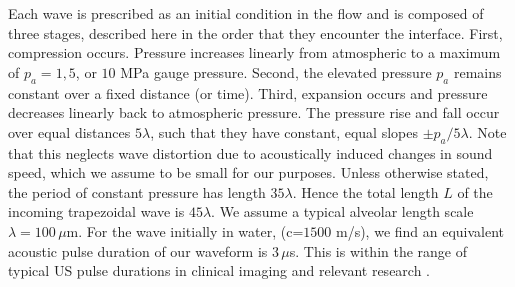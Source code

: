 Each wave is prescribed as an initial condition in the flow and is
composed of three stages, described here in the order that they
encounter the interface. First, compression occurs. Pressure increases
linearly from atmospheric to a maximum of $p_a=1, 5$, or $10$ MPa
gauge pressure. Second, the elevated pressure $p_a$ remains constant
over a fixed distance (or time). Third, expansion occurs and pressure
decreases linearly back to atmospheric pressure. The pressure rise and
fall occur over equal distances $5\lambda$, such that they have
constant, equal slopes $\pm p_{a}/5\lambda$. Note that this neglects
wave distortion due to acoustically induced changes in sound speed,
which we assume to be small for our purposes. Unless otherwise stated,
the period of constant pressure has length $35\lambda$. Hence the
total length $L$ of the incoming trapezoidal wave is $45\lambda$. We
assume a typical alveolar length scale $\lambda=100 \, \mu$m. For the
wave initially in water, (c=$1500$ m/s), we find an equivalent
acoustic pulse duration of our waveform is $3 \, \mu$s.  This is
within the range of typical \ac{US} pulse durations in clinical
imaging \citep{Edelman2005} and relevant research \citep{Obrien2006b}.
%
